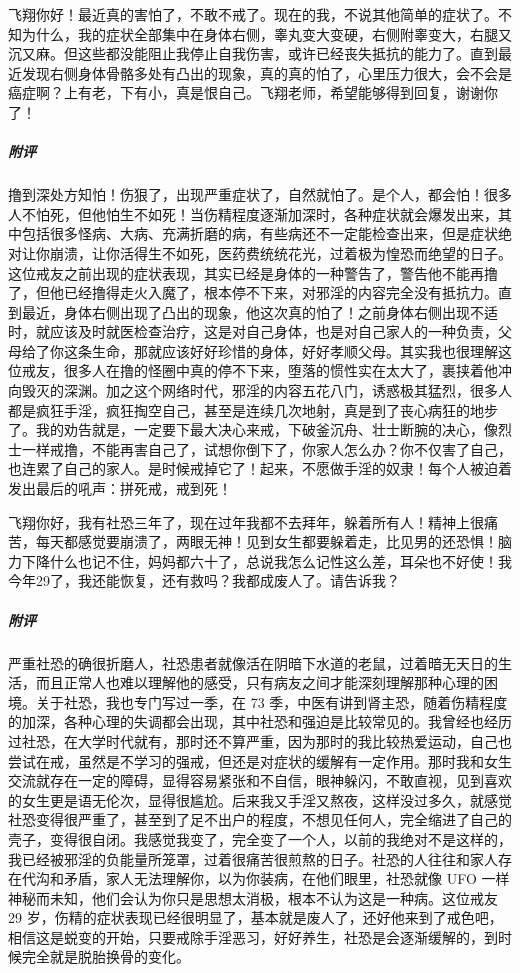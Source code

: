 \begin{case}
    飞翔你好！最近真的害怕了，不敢不戒了。现在的我，不说其他简单的症状了。不知为什么，我的症状全部集中在身体右侧，睾丸变大变硬，右侧附睾变大，右腿又沉又麻。但这些都没能阻止我停止自我伤害，或许已经丧失抵抗的能力了。直到最近发现右侧身体骨骼多处有凸出的现象，真的真的怕了，心里压力很大，会不会是癌症啊？上有老，下有小，真是恨自己。飞翔老师，希望能够得到回复，谢谢你了！
    \subparagraph{附评} 撸到深处方知怕！伤狠了，出现严重症状了，自然就怕了。是个人，都会怕！很多人不怕死，但他怕生不如死！当伤精程度逐渐加深时，各种症状就会爆发出来，其中包括很多怪病、大病、充满折磨的病，有些病还不一定能检查出来，但是症状绝对让你崩溃，让你活得生不如死，医药费统统花光，过着极为惶恐而绝望的日子。这位戒友之前出现的症状表现，其实已经是身体的一种警告了，警告他不能再撸了，但他已经撸得走火入魔了，根本停不下来，对邪淫的内容完全没有抵抗力。直到最近，身体右侧出现了凸出的现象，他这次真的怕了！之前身体右侧出现不适时，就应该及时就医检查治疗，这是对自己身体，也是对自己家人的一种负责，父母给了你这条生命，那就应该好好珍惜的身体，好好孝顺父母。其实我也很理解这位戒友，很多人在撸的怪圈中真的停不下来，堕落的惯性实在太大了，裹挟着他冲向毁灭的深渊。加之这个网络时代，邪淫的内容五花八门，诱惑极其猛烈，很多人都是疯狂手淫，疯狂掏空自己，甚至是连续几次地射，真是到了丧心病狂的地步了。我的劝告就是，一定要下最大决心来戒，下破釜沉舟、壮士断腕的决心，像烈士一样戒撸，不能再害自己了，试想你倒下了，你家人怎么办？你不仅害了自己，也连累了自己的家人。是时候戒掉它了！起来，不愿做手淫的奴隶！每个人被迫着发出最后的吼声：拼死戒，戒到死！
\end{case}

\begin{case}
    飞翔你好，我有社恐三年了，现在过年我都不去拜年，躲着所有人！精神上很痛苦，每天都感觉要崩溃了，两眼无神！见到女生都要躲着走，比见男的还恐惧！脑力下降什么也记不住，妈妈都六十了，总说我怎么记性这么差，耳朵也不好使！我今年29了，我还能恢复，还有救吗？我都成废人了。请告诉我？
    \subparagraph{附评} 严重社恐的确很折磨人，社恐患者就像活在阴暗下水道的老鼠，过着暗无天日的生活，而且正常人也难以理解他的感受，只有病友之间才能深刻理解那种心理的困境。关于社恐，我也专门写过一季，在 73 季，中医有讲到肾主恐，随着伤精程度的加深，各种心理的失调都会出现，其中社恐和强迫是比较常见的。我曾经也经历过社恐，在大学时代就有，那时还不算严重，因为那时的我比较热爱运动，自己也尝试在戒，虽然是不学习的强戒，但还是对症状的缓解有一定作用。那时我和女生交流就存在一定的障碍，显得容易紧张和不自信，眼神躲闪，不敢直视，见到喜欢的女生更是语无伦次，显得很尴尬。后来我又手淫又熬夜，这样没过多久，就感觉社恐变得很严重了，甚至到了足不出户的程度，不想见任何人，完全缩进了自己的壳子，变得很自闭。我感觉我变了，完全变了一个人，以前的我绝对不是这样的，我已经被邪淫的负能量所笼罩，过着很痛苦很煎熬的日子。社恐的人往往和家人存在代沟和矛盾，家人无法理解你，以为你装病，在他们眼里，社恐就像 UFO 一样神秘而未知，他们会认为你只是思想太消极，根本不认为这是一种病。这位戒友 29 岁，伤精的症状表现已经很明显了，基本就是废人了，还好他来到了戒色吧，相信这是蜕变的开始，只要戒除手淫恶习，好好养生，社恐是会逐渐缓解的，到时候完全就是脱胎换骨的变化。
\end{case}

